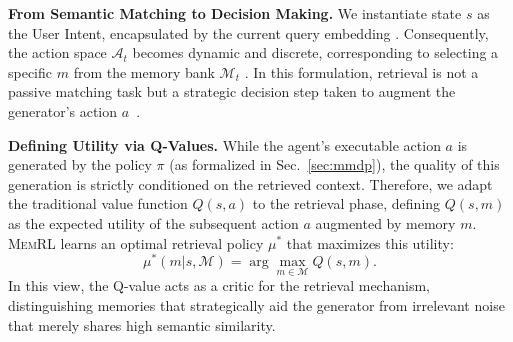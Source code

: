 \documentclass{article}
\theoremstyle{plain}
\theoremstyle{definition}
\theoremstyle{remark}
\begin{document}
\textbf{From Semantic Matching to Decision Making.} We instantiate state $s$ as the User Intent, encapsulated by the current query embedding \citep{lewis2020retrieval}. Consequently, the action space $\mathcal{A}_t$ becomes dynamic and discrete, corresponding to selecting a specific $m$ from the memory bank $\mathcal{M}_t$ \citep{zhou2025memento}. In this formulation, retrieval is not a passive matching task but a strategic decision step taken to augment the generator's action $a$~\citep{zhou2025memento}.


\textbf{Defining Utility via Q-Values.} While the agent's executable action $a$ is generated by the policy $\pi$ (as formalized in Sec.~\ref{sec:mmdp}), the quality of this generation is strictly conditioned on the retrieved context. Therefore, we adapt the traditional value function $Q(s, a)$ to the retrieval phase, defining $Q(s, m)$ as the expected utility of the subsequent action $a$ augmented by memory $m$. \textsc{MemRL} learns an optimal retrieval policy $\mu^*$ that maximizes this utility:
\begin{equation}
    \mu^*(m| s, \mathcal{M}) = \arg\max_{m \in \mathcal{M}} Q(s, m). \label{equ:optimal-policy}
\end{equation}
In this view, the Q-value acts as a critic for the retrieval mechanism, distinguishing memories that strategically aid the generator from irrelevant noise that merely shares high semantic similarity.


\end{document}
